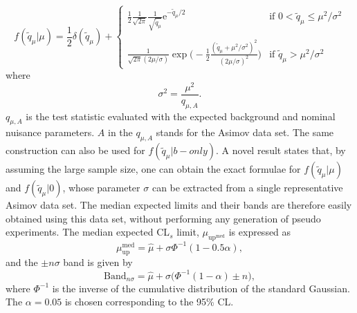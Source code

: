 	\[ f(\tilde{q}_{\mu}|\mu) = \frac{1}{2} \delta(\tilde{q}_{\mu})+
  \begin{cases}
  \displaystyle
     \frac{1}{2}\frac{1}{\sqrt{2\pi}}\frac{1}{\sqrt{\tilde{q}_{\mu}}} \mathrm{e}^{-\tilde{q}_{\mu}/2}   & \text{if } 0<\tilde{q}_{\mu}\leq\mu^2/\sigma^2\\
    \\
    \displaystyle
    \frac{1}{\sqrt{2\pi}(2\mu/\sigma)}\exp\bigg(-\frac{1}{2}\frac{(\tilde{q}_{\mu}+\mu^2/\sigma^2)^2}{(2\mu/\sigma)^2}\bigg)      & \text{if } \tilde{q}_{\mu}>\mu^2/\sigma^2
  \end{cases}
\]
where 
\begin{equation}
	\displaystyle
	\sigma^2 = \frac{\mu^2}{q_{\mu,A}}.
\end{equation}
	$q_{\mu,A}$ is the test statistic evaluated with the expected background and nominal nuisance parameters. $A$ in the $q_{\mu,A}$ stands for the Asimov data set\footnotemark. The same construction can also be used for $f(\tilde{q}_{\mu}|b-only)$. 
	A novel result states that, by assuming the large sample size, one can obtain the exact formulae for $f(\tilde{q}_{\mu}|\mu)$ and $f(\tilde{q}_{\mu}|0)$, whose parameter $\sigma$ can be extracted from a single representative Asimov data set. The median expected limits and their bands are therefore easily obtained using this data set, without performing any generation of pseudo experiments.
	The median expected CL$_{s}$ limit, $\mu_{\text{up}^{\text{med}}}$ is expressed as
	\begin{equation}
	\displaystyle
	\mu_{\text{up}}^{\text{med}} = \hat{\mu}+\sigma \Phi^{-1}(1-0.5\alpha), 
	\end{equation}
	and the $\pm n\sigma$ band is given by
	\begin{equation}
	\displaystyle
	\text{Band}_{n\sigma} = \hat{\mu}+\sigma \big(\Phi^{-1}(1-\alpha)\pm n\big), 
	\end{equation}
	where $\Phi^{-1}$ is the inverse of the cumulative distribution of the standard Gaussian. The $\alpha=0.05$ is chosen corresponding to the 95\% CL.
	  
